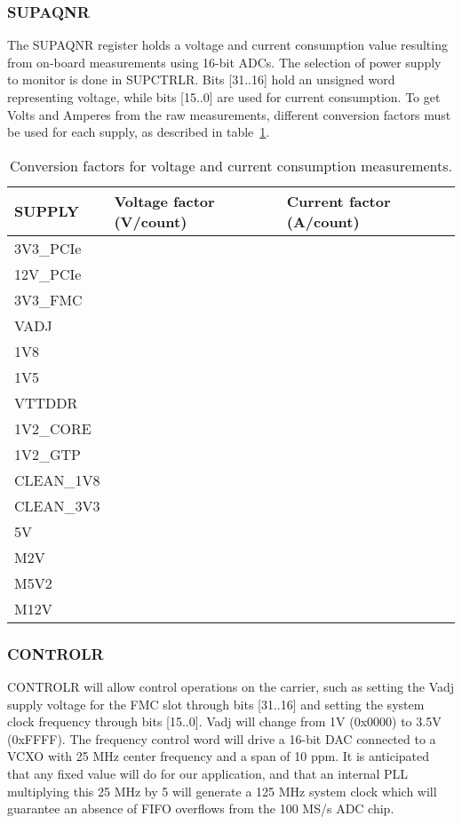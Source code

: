 \documentclass{article}
\begin{document}
\subsubsection{SUPAQNR}
The SUPAQNR register holds a voltage and current consumption value resulting from on-board measurements using 16-bit ADCs. The selection of power supply to monitor is done in SUPCTRLR. Bits [31..16] hold an unsigned word representing voltage, while bits [15..0] are used for current consumption. To get Volts and Amperes from the raw measurements, different conversion factors must be used for each supply, as described in table~\ref{tab:conv_fact}.

\begin{table}[htbp]
  \centering
  \begin{tabularx}{\textwidth}{|X|l|l|}
    \hline
    \textbf{SUPPLY} & \textbf{Voltage factor (V/count)} & \textbf{Current factor (A/count)} \\
    \hline
    \hline
    3V3\_PCIe & & \\
    \hline
    12V\_PCIe & & \\
    \hline
    3V3\_FMC & & \\
    \hline
    VADJ & & \\
    \hline
    1V8 & & \\
    \hline
    1V5 & & \\
    \hline
    VTTDDR & & \\
    \hline
    1V2\_CORE & & \\
    \hline
    1V2\_GTP & & \\
    \hline
    CLEAN\_1V8 & & \\
    \hline
    CLEAN\_3V3 & & \\
    \hline
    5V & & \\
    \hline
    M2V & & \\
    \hline
    M5V2 & & \\
    \hline
    M12V & & \\
    \hline
  \end{tabularx}
  \caption{Conversion factors for voltage and current consumption measurements.}
  \label{tab:conv_fact}
\end{table}

\subsubsection{CONTROLR}
CONTROLR will allow control operations on the carrier, such as setting the Vadj supply voltage for the FMC slot through bits [31..16] and setting the system clock frequency through bits [15..0]. Vadj will change from 1V (0x0000) to 3.5V (0xFFFF). The frequency control word will drive a 16-bit DAC connected to a VCXO with 25 MHz center frequency and a span of 10 ppm. It is anticipated that any fixed value will do for our application, and that an internal PLL multiplying this 25 MHz by 5 will generate a 125 MHz system clock which will guarantee an absence of FIFO overflows from the 100 MS/s ADC chip.
\end{document}
